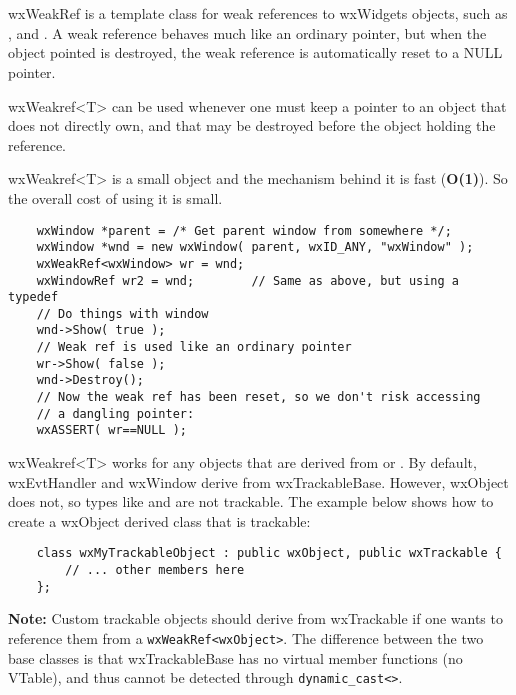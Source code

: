 \section{}\label{wxweakref}

wxWeakRef is a template class for weak references to wxWidgets objects, 
such as ,  and 
. A weak reference behaves much like an ordinary
pointer, but when the object pointed is destroyed, the weak reference is
automatically reset to a NULL pointer. 

wxWeakref<T> can be used whenever one must keep a pointer to an object 
that does not directly own, and that may be destroyed before the object 
holding the reference. 

wxWeakref<T> is a small object and the mechanism behind it is fast 
(\textbf{O(1)}). So the overall cost of using it is small. 



\begin{verbatim}
    wxWindow *parent = /* Get parent window from somewhere */;
    wxWindow *wnd = new wxWindow( parent, wxID_ANY, "wxWindow" );
    wxWeakRef<wxWindow> wr = wnd;  
    wxWindowRef wr2 = wnd;        // Same as above, but using a typedef
    // Do things with window
    wnd->Show( true );
    // Weak ref is used like an ordinary pointer 
    wr->Show( false );
    wnd->Destroy(); 
    // Now the weak ref has been reset, so we don't risk accessing
    // a dangling pointer:
    wxASSERT( wr==NULL );
\end{verbatim}

wxWeakref<T> works for any objects that are derived from 
 or .
By default, wxEvtHandler and wxWindow derive from wxTrackableBase. However, 
wxObject does not, so types like  and 
 are not trackable. The example below shows how to
create a wxObject derived class that is trackable: 

\begin{verbatim}
    class wxMyTrackableObject : public wxObject, public wxTrackable { 
        // ... other members here 
    }; 
\end{verbatim}

\textbf{Note:} Custom trackable objects should derive from wxTrackable 
if one wants to reference them from a \texttt{wxWeakRef<wxObject>}. The 
difference between the two base classes is that wxTrackableBase 
has no virtual member functions (no VTable), and thus cannot be detected
through \texttt{dynamic\_cast<>}.

